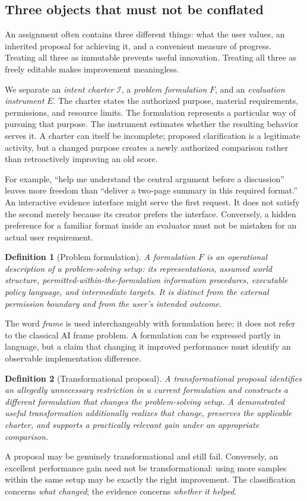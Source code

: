 \documentclass[11pt,letterpaper]{article}
\newcommand{\I}{\mathcal I}
\newtheorem{definition}{Definition}[section]
\theoremstyle{remark}\newtheorem{remark}{Remark}[section]
\begin{document}
\subsection{Three objects that must not be conflated}
An assignment often contains three different things: what the user values, an inherited proposal for achieving it, and a convenient measure of progress. Treating all three as immutable prevents useful innovation. Treating all three as freely editable makes improvement meaningless.

We separate an \emph{intent charter} $\I$, a \emph{problem formulation} $F$, and an \emph{evaluation instrument} $E$. The charter states the authorized purpose, material requirements, permissions, and resource limits. The formulation represents a particular way of pursuing that purpose. The instrument estimates whether the resulting behavior serves it. A charter can itself be incomplete; proposed clarification is a legitimate activity, but a changed purpose creates a newly authorized comparison rather than retroactively improving an old score.

For example, ``help me understand the central argument before a discussion'' leaves more freedom than ``deliver a two-page summary in this required format.'' An interactive evidence interface might serve the first request. It does not satisfy the second merely because its creator prefers the interface. Conversely, a hidden preference for a familiar format inside an evaluator must not be mistaken for an actual user requirement.

\begin{definition}[Problem formulation]
A formulation $F$ is an operational description of a problem-solving setup: its representations, assumed world structure, permitted-within-the-formulation information procedures, executable policy language, and intermediate targets. It is distinct from the external permission boundary and from the user's intended outcome.
\end{definition}
The word \emph{frame} is used interchangeably with formulation here; it does not refer to the classical AI frame problem. A formulation can be expressed partly in language, but a claim that changing it improved performance must identify an observable implementation difference.

\begin{definition}[Transformational proposal]
A transformational proposal identifies an allegedly unnecessary restriction in a current formulation and constructs a different formulation that changes the problem-solving setup. A \emph{demonstrated useful transformation} additionally realizes that change, preserves the applicable charter, and supports a practically relevant gain under an appropriate comparison.
\end{definition}
A proposal may be genuinely transformational and still fail. Conversely, an excellent performance gain need not be transformational: using more samples within the same setup may be exactly the right improvement. The classification concerns \emph{what changed}; the evidence concerns \emph{whether it helped}.
\end{document}
